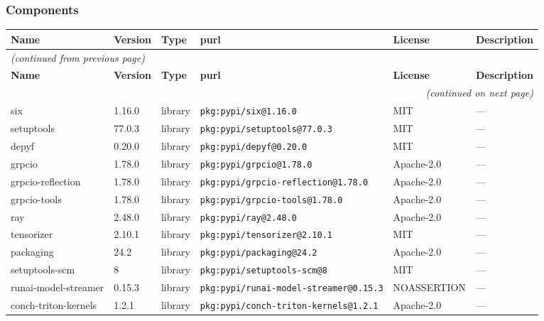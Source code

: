 \documentclass[11pt,a4paper]{article}
\begin{document}
\subsubsection*{Components}
\begin{longtable}{|p{4cm}|p{2cm}|p{1.6cm}|p{5cm}|p{1.5cm}|p{3.5cm}|}
\toprule
\rowcolor{sbomhdr}\textbf{Name} & \textbf{Version} & \textbf{Type} & \textbf{purl} & \textbf{License} & \textbf{Description} \\
\midrule
\endfirsthead
\multicolumn{6}{l}{\small\itshape (continued from previous page)} \\
\toprule
\rowcolor{sbomhdr}\textbf{Name} & \textbf{Version} & \textbf{Type} & \textbf{purl} & \textbf{License} & \textbf{Description} \\
\midrule
\endhead
\midrule
\multicolumn{6}{r}{\small\itshape (continued on next page)} \\
\endfoot
\bottomrule
\endlastfoot
\raggedright six & 1.16.0 & library & \small\texttt{pkg:pypi/six@1.16.0} & MIT & \small — \\
\raggedright setuptools & 77.0.3 & library & \small\texttt{pkg:pypi/setuptools@77.0.3} & MIT & \small — \\
\raggedright depyf & 0.20.0 & library & \small\texttt{pkg:pypi/depyf@0.20.0} & MIT & \small — \\
\raggedright grpcio & 1.78.0 & library & \small\texttt{pkg:pypi/grpcio@1.78.0} & Apache-2.0 & \small — \\
\raggedright grpcio-reflection & 1.78.0 & library & \small\texttt{pkg:pypi/grpcio-reflection@1.78.0} & Apache-2.0 & \small — \\
\raggedright grpcio-tools & 1.78.0 & library & \small\texttt{pkg:pypi/grpcio-tools@1.78.0} & Apache-2.0 & \small — \\
\raggedright ray & 2.48.0 & library & \small\texttt{pkg:pypi/ray@2.48.0} & Apache-2.0 & \small — \\
\raggedright tensorizer & 2.10.1 & library & \small\texttt{pkg:pypi/tensorizer@2.10.1} & MIT & \small — \\
\raggedright packaging & 24.2 & library & \small\texttt{pkg:pypi/packaging@24.2} & Apache-2.0 & \small — \\
\raggedright setuptools-scm & 8 & library & \small\texttt{pkg:pypi/setuptools-scm@8} & MIT & \small — \\
\raggedright runai-model-streamer & 0.15.3 & library & \small\texttt{pkg:pypi/runai-model-streamer@0.15.3} & NOASSERTION & \small — \\
\raggedright conch-triton-kernels & 1.2.1 & library & \small\texttt{pkg:pypi/conch-triton-kernels@1.2.1} & Apache-2.0 & \small — \\

\end{longtable}
\end{document}
